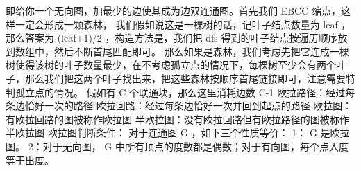 {}
\markdownRendererSectionEnd \markdownRendererSectionBegin
{}\markdownRendererInterblockSeparator
{}\markdownRendererInterblockSeparator
{}
\markdownRendererSectionEnd \markdownRendererSectionBegin
{}\markdownRendererInterblockSeparator
{}\markdownRendererInterblockSeparator
{}
\markdownRendererSectionEnd \markdownRendererSectionBegin
{}\markdownRendererInterblockSeparator
{}即给你一个无向图，加最少的边使其成为边双连通图。首先我们\markdownRendererDollarSign{} EBCC \markdownRendererDollarSign{}缩点，这样一定会形成一颗森林，\markdownRendererParagraphSeparator
{}我们假如说这是一棵树的话，记叶子结点数量为\markdownRendererDollarSign{} leaf \markdownRendererDollarSign{}，那么答案为\markdownRendererDollarSign{} (leaf+1)/2 \markdownRendererDollarSign{}，构造方法是，我们把\markdownRendererDollarSign{} dfs \markdownRendererDollarSign{}得到的叶子结点按遍历顺序放到数组中，然后不断首尾匹配即可。\markdownRendererParagraphSeparator
{}那么如果是森林，我们考虑先把它连成一棵树使得该树的叶子数量最少，在不考虑孤立点的情况下，每棵树至少会有两个叶子，那么我们把这两个叶子找出来，把这些森林按顺序首尾链接即可，注意需要特判孤立点的情况。\markdownRendererParagraphSeparator
{}假如有\markdownRendererDollarSign{} C \markdownRendererDollarSign{}个联通块，那么这里消耗边数\markdownRendererDollarSign{} C-1 \markdownRendererDollarSign{}\markdownRendererInterblockSeparator
{}
\markdownRendererSectionEnd 
\markdownRendererSectionEnd 
\markdownRendererSectionEnd \markdownRendererSectionBegin
{}\markdownRendererInterblockSeparator
{}欧拉路径：经过每条边恰好一次的路径\markdownRendererParagraphSeparator
{}欧拉回路：经过每条边恰好一次并回到起点的路径\markdownRendererParagraphSeparator
{}欧拉图：有欧拉回路的图被称作欧拉图\markdownRendererParagraphSeparator
{}半欧拉图：没有欧拉回路但有欧拉路径的图被称作半欧拉图\markdownRendererParagraphSeparator
{}欧拉图判断条件：\markdownRendererParagraphSeparator
{}对于连通图\markdownRendererDollarSign{} G \markdownRendererDollarSign{}，如下三个性质等价：\markdownRendererParagraphSeparator
{}1：\markdownRendererDollarSign{} G \markdownRendererDollarSign{}是欧拉图。\markdownRendererParagraphSeparator
{}2：对于无向图，\markdownRendererDollarSign{} G \markdownRendererDollarSign{}中所有顶点的度数都是偶数；对于有向图，每个点入度等于出度。\markdownRendererParagraphSeparator
